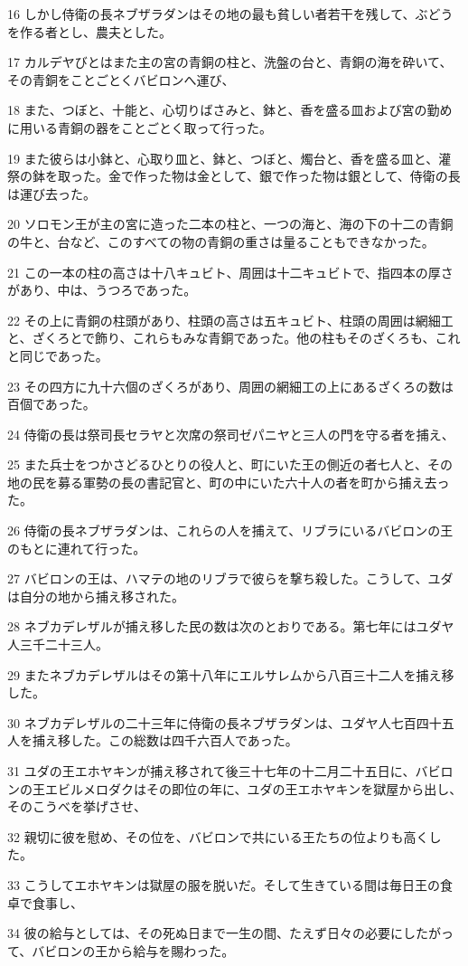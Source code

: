 \par 16 しかし侍衛の長ネブザラダンはその地の最も貧しい者若干を残して、ぶどうを作る者とし、農夫とした。
\par 17 カルデヤびとはまた主の宮の青銅の柱と、洗盤の台と、青銅の海を砕いて、その青銅をことごとくバビロンへ運び、
\par 18 また、つぼと、十能と、心切りばさみと、鉢と、香を盛る皿および宮の勤めに用いる青銅の器をことごとく取って行った。
\par 19 また彼らは小鉢と、心取り皿と、鉢と、つぼと、燭台と、香を盛る皿と、灌祭の鉢を取った。金で作った物は金として、銀で作った物は銀として、侍衛の長は運び去った。
\par 20 ソロモン王が主の宮に造った二本の柱と、一つの海と、海の下の十二の青銅の牛と、台など、このすべての物の青銅の重さは量ることもできなかった。
\par 21 この一本の柱の高さは十八キュビト、周囲は十二キュビトで、指四本の厚さがあり、中は、うつろであった。
\par 22 その上に青銅の柱頭があり、柱頭の高さは五キュビト、柱頭の周囲は網細工と、ざくろとで飾り、これらもみな青銅であった。他の柱もそのざくろも、これと同じであった。
\par 23 その四方に九十六個のざくろがあり、周囲の網細工の上にあるざくろの数は百個であった。
\par 24 侍衛の長は祭司長セラヤと次席の祭司ゼパニヤと三人の門を守る者を捕え、
\par 25 また兵士をつかさどるひとりの役人と、町にいた王の側近の者七人と、その地の民を募る軍勢の長の書記官と、町の中にいた六十人の者を町から捕え去った。
\par 26 侍衛の長ネブザラダンは、これらの人を捕えて、リブラにいるバビロンの王のもとに連れて行った。
\par 27 バビロンの王は、ハマテの地のリブラで彼らを撃ち殺した。こうして、ユダは自分の地から捕え移された。
\par 28 ネブカデレザルが捕え移した民の数は次のとおりである。第七年にはユダヤ人三千二十三人。
\par 29 またネブカデレザルはその第十八年にエルサレムから八百三十二人を捕え移した。
\par 30 ネブカデレザルの二十三年に侍衛の長ネブザラダンは、ユダヤ人七百四十五人を捕え移した。この総数は四千六百人であった。
\par 31 ユダの王エホヤキンが捕え移されて後三十七年の十二月二十五日に、バビロンの王エビルメロダクはその即位の年に、ユダの王エホヤキンを獄屋から出し、そのこうべを挙げさせ、
\par 32 親切に彼を慰め、その位を、バビロンで共にいる王たちの位よりも高くした。
\par 33 こうしてエホヤキンは獄屋の服を脱いだ。そして生きている間は毎日王の食卓で食事し、
\par 34 彼の給与としては、その死ぬ日まで一生の間、たえず日々の必要にしたがって、バビロンの王から給与を賜わった。


